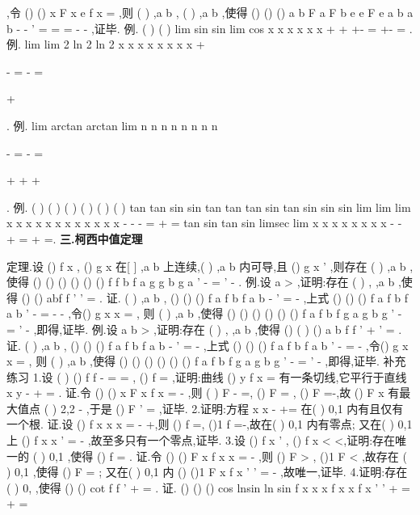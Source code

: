 ,令
()
()
x
F x
e f x
=
,则 
(
)
,a b
\eta 
\exists 
\in 
,
(
)
,a b
\psi \in 
,使得
()
()
()
a
b
F a
F b
e
e
F
e
a
b
a
b
\psi 
\eta 
-
-
'
=
=
=
-
-
,证毕. 
\textcolor{lyred}{例}.
(
)
(
)
lim sin
sin
lim
cos
x
x
x
x
x
x
\psi 
\to +\infty 
\to +\infty 
+-
=
+-
\cdots 
=
. 
\textcolor{lyred}{例}.
lim
lim
2 ln 2
ln 2
x
x
x
x
x
x
x
x
\psi 
+
\to \infty 
\to \infty 




-
=
-
\cdots 
=




+




. 
\textcolor{lyred}{例}.
lim
arctan
arctan
lim
n
n
n
n
n
n
n
n
\psi 
\to \infty 
\to \infty 




-
=
-
\cdots 
=




+
+
+




. 
\textcolor{lyred}{例}.
(
)
(
)
(
)
(
)
(
)
(
)
tan tan
sin sin
tan tan
tan sin
tan sin
sin sin
lim
lim
lim
x
x
x
x
x
x
x
x
x
x
x
x
\to 
\to 
\to 
-
-
-
=
+
= 
tan
sin
tan
sin
limsec
lim
x
x
x
x
x
x
x
x
\psi 
\to 
\to 
-
-
\cdots 
+
=
+
=. 
\vspace{4pt}
{\bfseries \textcolor{lyred}{三.柯西中值定理}}

\textcolor{lyred}{定理}.设
()
f x , ()
g x 在[
]
,a b 上连续,(
)
,a b 内可导,且
()
g
x
'
\neq 
,则存在
(
)
,a b
\psi \in 
, 
使得
()
()
()
()
()
()
f
f b
f a
g
g b
g a
\psi 
\psi 
'
-
=
'
-
. 
\textcolor{lyred}{例}.设
a >
,证明:存在
(
)
,
,a b
\psi \eta \in 
,使得
()
()
abf
f
\psi 
\eta 
\eta 
'
'
=
. 
证.
(
)
,a b
\psi 
\exists \in 
,
()
()
()
f a
f b
f
a
b
\psi 
-
'
=
-
,上式
()
()
()
f a
f b
f
a
b
\eta 
\eta 
'
-
\Leftrightarrow 
=
-
-
,令()
g x
x
=
, 
则
(
)
,a b
\eta 
\exists 
\in 
,使得
()
()
()
()
()
()
f a
f b
f
g a
g b
g
\eta 
\eta 
'
-
=
'
-
,即得,证毕. 
\textcolor{lyred}{例}.设
a b
\cdots 
>
,证明:存在
(
)
,
,a b
\psi \eta \in 
,使得
()
(
)
()
a
b f
f
\eta 
\psi 
\eta 
'
+
'
=
. 
证.
(
)
,a b
\psi 
\exists \in 
,
()
()
()
f a
f b
f
a
b
\psi 
-
'
=
-
,上式
()
()
()
f a
f b
f
a
b
\eta 
\eta 
'
-
\Leftrightarrow 
=
-
,令()
g x
x
=
, 
则
(
)
,a b
\eta 
\exists 
\in 
,使得
()
()
()
()
()
()
f a
f b
f
g a
g b
g
\eta 
\eta 
'
-
=
'
-
,即得,证毕. 
\textcolor{lyred}{补充练习 }
1.设
(
)
()
f
f
-
=
=
,
()
f
=
,证明:曲线
()
y
f x
=
有一条切线,它平行于直线 
x
y
-
+
=
. 
证.令
()
()
x
F x
f x
=
-
,则
(
)
F -
=,
()
F
=
,
()
F
=-,故
()
F x 有最大值点 
(
)
2,2
\psi \in -
,于是
()
F \psi 
'
=
,证毕. 
2.证明:方程
x
x
-
+=
在(
)
0,1 内有且仅有一个根. 
证.设
()
f x
x
x
=
-
+,则
()
f
=,
()1
f
=-,故在(
)
0,1 内有零点; 
又在(
)
0,1 上
()
f
x
x
'
=
-
\neq 
,故至多只有一个零点,证毕. 
3.设
()
f
x
'
\neq ,
()
f x
<
<,证明:存在唯一的
(
)
0,1
\psi \in 
,使得
()
f \psi 
\psi 
=
. 
证.令
()
()
F x
f x
x
=
-
,则
()
F
>
,
()1
F
<
,故存在
(
)
0,1
\psi \in 
,使得
()
F \psi =
; 
又在(
)
0,1 内
()
()1
F
x
f
x
'
'
=
-\neq 
,故\psi 唯一,证毕. 
4.证明:存在
(
)
0,
\psi 
\pi 
\in 
,使得
()
()
cot
f
f
\psi 
\psi 
\psi 
'
\cdots 
+
=
. 
证.
()
()
()
cos
lnsin
ln
sin
f
x
x
x
f x
x
f x
'
'
+
=
\Leftrightarrow 
+
=





